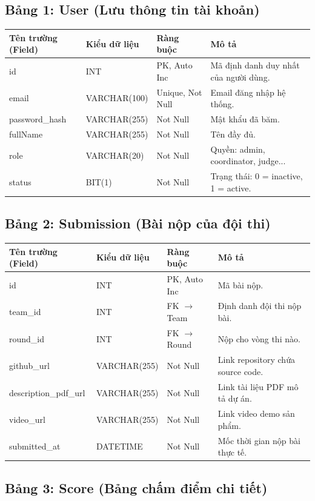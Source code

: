\subsection{Bảng 1: User (Lưu thông tin tài khoản)}

\begin{tabular}{llll}
\toprule
\textbf{Tên trường (Field)} & \textbf{Kiểu dữ liệu} & \textbf{Ràng buộc} & \textbf{Mô tả} \\ \midrule
id & INT & PK, Auto Inc & Mã định danh duy nhất của người dùng. \\
email & VARCHAR(100) & Unique, Not Null & Email đăng nhập hệ thống. \\
password\_hash & VARCHAR(255) & Not Null & Mật khẩu đã băm. \\
fullName & VARCHAR(255) & Not Null & Tên đầy đủ. \\
role & VARCHAR(20) & Not Null & Quyền: admin, coordinator, judge... \\
status & BIT(1) & Not Null & Trạng thái: 0 = inactive, 1 = active. \\ \bottomrule
\end{tabular}

\subsection{Bảng 2: Submission (Bài nộp của đội thi)}

\begin{tabular}{llll}
\toprule
\textbf{Tên trường (Field)} & \textbf{Kiểu dữ liệu} & \textbf{Ràng buộc} & \textbf{Mô tả} \\ \midrule
id & INT & PK, Auto Inc & Mã bài nộp. \\
team\_id & INT & FK $\rightarrow$ Team & Định danh đội thi nộp bài. \\
round\_id & INT & FK $\rightarrow$ Round & Nộp cho vòng thi nào. \\
github\_url & VARCHAR(255) & Not Null & Link repository chứa source code. \\
description\_pdf\_url & VARCHAR(255) & Not Null & Link tài liệu PDF mô tả dự án. \\
video\_url & VARCHAR(255) & Not Null & Link video demo sản phẩm. \\
submitted\_at & DATETIME & Not Null & Mốc thời gian nộp bài thực tế. \\ \bottomrule
\end{tabular}

\subsection{Bảng 3: Score (Bảng chấm điểm chi tiết)}

